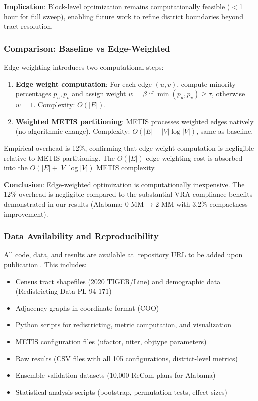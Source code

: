 \textbf{Implication}: Block-level optimization remains computationally feasible ($<$1 hour for full sweep), enabling future work to refine district boundaries beyond tract resolution.

\subsubsection{Comparison: Baseline vs Edge-Weighted}

Edge-weighting introduces two computational steps:
\begin{enumerate}
    \item \textbf{Edge weight computation}: For each edge $(u, v)$, compute minority percentages $p_u, p_v$ and assign weight $w = \beta$ if $\min(p_u, p_v) \geq \tau$, otherwise $w = 1$. Complexity: $O(|E|)$.
    \item \textbf{Weighted METIS partitioning}: METIS processes weighted edges natively (no algorithmic change). Complexity: $O(|E| + |V|\log|V|)$, same as baseline.
\end{enumerate}

Empirical overhead is 12\%, confirming that edge-weight computation is negligible relative to METIS partitioning. The $O(|E|)$ edge-weighting cost is absorbed into the $O(|E| + |V|\log|V|)$ METIS complexity.

\textbf{Conclusion}: Edge-weighted optimization is computationally inexpensive. The 12\% overhead is negligible compared to the substantial VRA compliance benefits demonstrated in our results (Alabama: 0 MM → 2 MM with 3.2\% compactness improvement).

\subsubsection{Data Availability and Reproducibility}

All code, data, and results are available at [repository URL to be added upon publication]. This includes:
\begin{itemize}
    \item Census tract shapefiles (2020 TIGER/Line) and demographic data (Redistricting Data PL 94-171)
    \item Adjacency graphs in coordinate format (COO)
    \item Python scripts for redistricting, metric computation, and visualization
    \item METIS configuration files (ufactor, niter, objtype parameters)
    \item Raw results (CSV files with all 105 configurations, district-level metrics)
    \item Ensemble validation datasets (10,000 ReCom plans for Alabama)
    \item Statistical analysis scripts (bootstrap, permutation tests, effect sizes)
\end{itemize}

